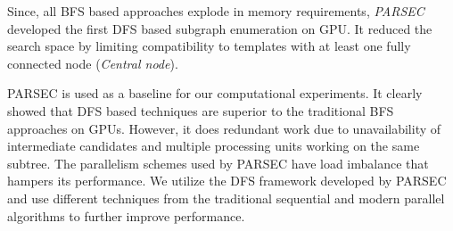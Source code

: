 Since, all BFS based approaches explode in memory requirements, \textit{PARSEC} \cite{PARSEC_VD} developed the first DFS based subgraph enumeration on GPU.
It reduced the search space by limiting compatibility to templates with at least one fully connected node (\textit{Central node}).

PARSEC \cite{PARSEC_VD} is used as a baseline for our computational experiments. It clearly showed that DFS based techniques are superior to the traditional BFS approaches on GPUs.
However, it does redundant work due to unavailability of intermediate candidates and multiple processing units working on the same subtree.
The parallelism schemes used by PARSEC have load imbalance that hampers its performance.
We utilize the DFS framework developed by PARSEC and use different techniques from the traditional sequential and modern parallel algorithms to further improve performance.